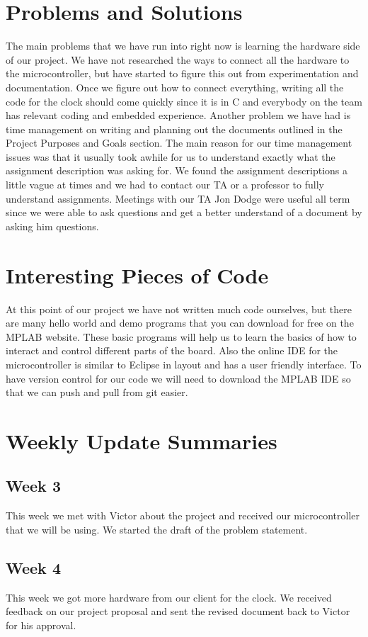 \documentclass[10pt,draftclsnofoot,onecolumn]{IEEEtran}
\begin{document}
\section{Problems and Solutions}
The main problems that we have run into right now is learning the hardware side of our project.
We have not researched the ways to connect all the hardware to the microcontroller, but have started to figure this out from experimentation and documentation.
Once we figure out how to connect everything, writing all the code for the clock should come quickly since it is in C and everybody on the team has relevant coding and embedded experience.
Another problem we have had is time management on writing and planning out the documents outlined in the Project Purposes and Goals section. 
The main reason for our time management issues was that it usually took awhile for us to understand exactly what the assignment description was asking for.
We found the assignment descriptions a little vague at times and we had to contact our TA or a professor to fully understand assignments.
Meetings with our TA Jon Dodge were useful all term since we were able to ask questions and get a better understand of a document by asking him questions.

\section{Interesting Pieces of Code}
At this point of our project we have not written much code ourselves, but there are many hello world and demo programs that you can download for free on the MPLAB website.
These basic programs will help us to learn the basics of how to interact and control different parts of the board. 
Also the online IDE for the microcontroller is similar to Eclipse in layout and has a user friendly interface. 
To have version control for our code we will need to download the MPLAB IDE so that we can push and pull from git easier. 

\section{Weekly Update Summaries}
\subsection{Week 3}
This week we met with Victor about the project and received our microcontroller that we will be using. 
We started the draft of the problem statement.

\subsection{Week 4}
This week we got more hardware from our client for the clock. 
We received feedback on our project proposal and sent the revised document back to Victor for his approval.
\end{document}
